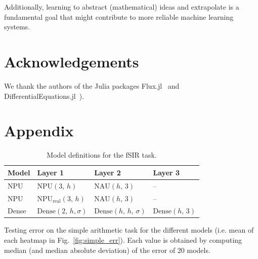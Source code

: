 \documentclass[9pt]{article}
\newcommand{\npu}{\text{NPU}}
\newcommand{\nau}{\text{NAU}}
\newcommand{\dense}{\text{Dense}}
\begin{document}
Additionally, learning to abstract (mathematical) ideas and extrapolate is a
fundamental goal that might contribute to more reliable machine learning
systems.

\section{Acknowledgements}%
\label{sec:acknowledgements}

We thank the authors of the Julia packages
Flux.jl~\citep{innes_fashionable_2018} and
DifferentialEquations.jl~\citep{rackauckas_differentialequationsjl_2017}).




\newpage
\appendix
\section*{Appendix}%
\label{sec:appendix}

\setcounter{table}{0}
\renewcommand{\thetable}{A\arabic{table}}

\begin{table}[h]
  \centering
  \caption{Model definitions for the fSIR task.}
  \label{tab:fsir_models}
  \begin{tabular}{llll}
    \toprule
    Model & Layer 1 & Layer 2 & Layer 3 \\
    \midrule
    NPU & $\npu(3,\,h)$ & $\nau(h,\,3)$ & -- \\
    NPU & NPU$_{\text{real}}(3,\,h)$ & $\nau(h,\,3)$ & -- \\
    Dense & $\dense(2,\,h,\sigma)$ & $\dense(h,\,h,\,\sigma)$ & $\dense(h,\,3)$ \\
    \bottomrule
  \end{tabular}
\end{table}



\begin{table}[h]
  \centering
  \caption{Testing error on the simple arithmetic task for the different models
  (i.e. mean of each heatmap in Fig.~\ref{fig:simple_err}). Each value is
  obtained by computing median (and median absolute deviation) of the error of
  20 models.}
  \label{tab:simple_err}
  \small
  
\end{table}
\end{document}
